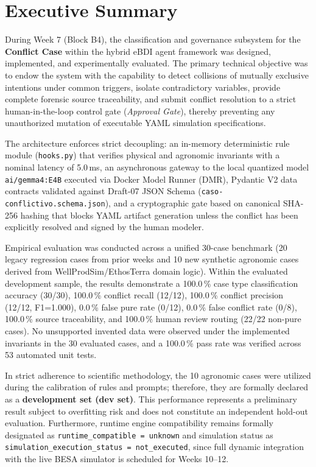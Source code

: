 \documentclass[11pt,a4paper]{article}
\begin{document}
\section{Executive Summary}
During Week 7 (Block B4), the classification and governance subsystem for the \textbf{Conflict Case} within the hybrid eBDI agent framework was designed, implemented, and experimentally evaluated. The primary technical objective was to endow the system with the capability to detect collisions of mutually exclusive intentions under common triggers, isolate contradictory variables, provide complete forensic source traceability, and submit conflict resolution to a strict human-in-the-loop control gate (\textit{Approval Gate}), thereby preventing any unauthorized mutation of executable YAML simulation specifications.

The architecture enforces strict decoupling: an in-memory deterministic rule module (\texttt{hooks.py}) that verifies physical and agronomic invariants with a nominal latency of 5.0\,ms, an asynchronous gateway to the local quantized model \texttt{ai/gemma4:E4B} executed via Docker Model Runner (DMR), Pydantic V2 data contracts validated against Draft-07 JSON Schema (\texttt{caso-conflictivo.schema.json}), and a cryptographic gate based on canonical SHA-256 hashing that blocks YAML artifact generation unless the conflict has been explicitly resolved and signed by the human modeler.

Empirical evaluation was conducted across a unified 30-case benchmark (20 legacy regression cases from prior weeks and 10 new synthetic agronomic cases derived from WellProdSim/EthosTerra domain logic). Within the evaluated development sample, the results demonstrate a 100.0\,\% case type classification accuracy (30/30), 100.0\,\% conflict recall (12/12), 100.0\,\% conflict precision (12/12, F1=1.000), 0.0\,\% false pure rate (0/12), 0.0\,\% false conflict rate (0/8), 100.0\,\% source traceability, and 100.0\,\% human review routing (22/22 non-pure cases). No unsupported invented data were observed under the implemented invariants in the 30 evaluated cases, and a 100.0\,\% pass rate was verified across 53 automated unit tests.

In strict adherence to scientific methodology, the 10 agronomic cases were utilized during the calibration of rules and prompts; therefore, they are formally declared as a \textbf{development set (dev set)}. This performance represents a preliminary result subject to overfitting risk and does not constitute an independent hold-out evaluation. Furthermore, runtime engine compatibility remains formally designated as \texttt{runtime\_compatible = unknown} and simulation status as \texttt{simulation\_execution\_status = not\_executed}, since full dynamic integration with the live BESA simulator is scheduled for Weeks 10--12.
\end{document}
